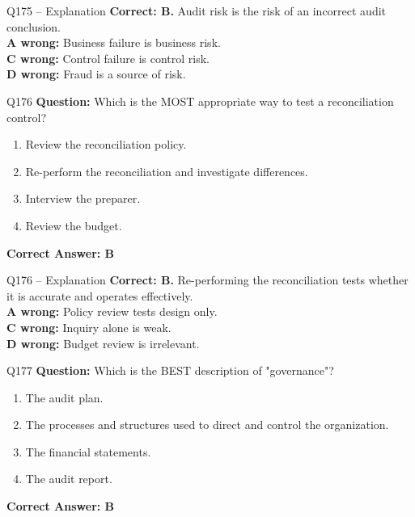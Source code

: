 \documentclass[aspectratio=169,10pt]{beamer}
\begin{document}
	\begin{frame}[t]{Q175 -- Explanation}
		\small
		\textbf{Correct: B.} Audit risk is the risk of an incorrect audit conclusion. \\[4pt]
		\textbf{A wrong:} Business failure is business risk. \\[2pt]
		\textbf{C wrong:} Control failure is control risk. \\[2pt]
		\textbf{D wrong:} Fraud is a source of risk.
	\end{frame}
	
	\begin{frame}[t]{Q176}
		\small
		\textbf{Question:} Which is the MOST appropriate way to test a reconciliation control?
		\begin{enumerate}[label=\Alph*.,itemsep=1pt,topsep=2pt]
			\item Review the reconciliation policy.
			\item Re-perform the reconciliation and investigate differences.
			\item Interview the preparer.
			\item Review the budget.
		\end{enumerate}
		\vspace{4pt}
		\textbf{Correct Answer: B}
	\end{frame}
	
	\begin{frame}[t]{Q176 -- Explanation}
		\small
		\textbf{Correct: B.} Re-performing the reconciliation tests whether it is accurate and operates effectively. \\[4pt]
		\textbf{A wrong:} Policy review tests design only. \\[2pt]
		\textbf{C wrong:} Inquiry alone is weak. \\[2pt]
		\textbf{D wrong:} Budget review is irrelevant.
	\end{frame}
	
	\begin{frame}[t]{Q177}
		\small
		\textbf{Question:} Which is the BEST description of "governance"?
		\begin{enumerate}[label=\Alph*.,itemsep=1pt,topsep=2pt]
			\item The audit plan.
			\item The processes and structures used to direct and control the organization.
			\item The financial statements.
			\item The audit report.
		\end{enumerate}
		\vspace{4pt}
		\textbf{Correct Answer: B}
	\end{frame}
	
\end{document}
